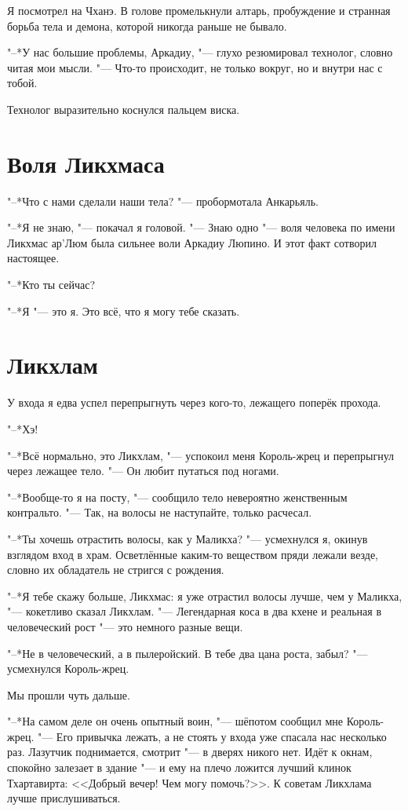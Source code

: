 \documentclass[a4paper,10pt,fleqn]{book}
\begin{document}
Я посмотрел на Чханэ.
В голове промелькнули алтарь, пробуждение и странная борьба тела и демона, которой никогда раньше не бывало.

"--*У нас большие проблемы, Аркадиу, "--- глухо резюмировал технолог, словно читая мои мысли.
"--- Что-то происходит, не только вокруг, но и внутри нас с тобой.

Технолог выразительно коснулся пальцем виска.

\section{Воля Ликхмаса}

"--*Что с нами сделали наши тела? "--- пробормотала Анкарьяль.

"--*Я не знаю, "--- покачал я головой.
"--- Знаю одно "--- воля человека по имени Ликхмас ар'Люм была сильнее воли Аркадиу Люпино.
И этот факт сотворил настоящее.

"--*Кто ты сейчас?

"--*Я "--- это я.
Это всё, что я могу тебе сказать.

\section{Ликхлам}

У входа я едва успел перепрыгнуть через кого-то, лежащего поперёк прохода.

"--*Хэ!

"--*Всё нормально, это Ликхлам, "--- успокоил меня Король-жрец и перепрыгнул через лежащее тело.
"--- Он любит путаться под ногами.

"--*Вообще-то я на посту, "--- сообщило тело невероятно женственным контральто.
"--- Так, на волосы не наступайте, только расчесал.

"--*Ты хочешь отрастить волосы, как у Маликха? "--- усмехнулся я, окинув взглядом вход в храм.
Осветлённые каким-то веществом пряди лежали везде, словно их обладатель не стригся с рождения.

"--*Я тебе скажу больше, Ликхмас: я уже отрастил волосы лучше, чем у Маликха, "--- кокетливо сказал Ликхлам.
"--- Легендарная коса в два кхене и реальная в человеческий рост "--- это немного разные вещи.

"--*Не в человеческий, а в пылеройский.
В тебе два цана роста, забыл? "--- усмехнулся Король-жрец.

Мы прошли чуть дальше.

"--*На самом деле он очень опытный воин, "--- шёпотом сообщил мне Король-жрец.
"--- Его привычка лежать, а не стоять у входа уже спасала нас несколько раз.
Лазутчик поднимается, смотрит "--- в дверях никого нет.
Идёт к окнам, спокойно залезает в здание "--- и ему на плечо ложится лучший клинок Тхартавирта: <<Добрый вечер!
Чем могу помочь?>>.
К советам Ликхлама лучше прислушиваться.
\end{document}
